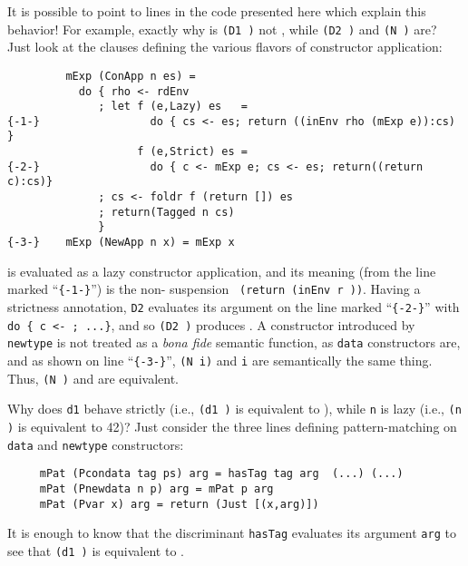 \documentclass{entcs} \usepackage{entcsmacro}
\begin{document}
{It is possible to point to lines in the code presented here which explain this
behavior! For example, exactly why is {\tt (D1 \undef)} not \undef, while {\tt (D2
\undef)} and {\tt (N \undef)} are? Just look at the clauses defining the various
flavors of constructor application:

\begin{minipage}[h]{6in}
{\footnotesize
\begin{verbatim}
         mExp (ConApp n es) =
           do { rho <- rdEnv
              ; let f (e,Lazy) es   =
{-1-}                 do { cs <- es; return ((inEnv rho (mExp e)):cs) }
                    f (e,Strict) es =
{-2-}                 do { c <- mExp e; cs <- es; return((return c):cs)}
              ; cs <- foldr f (return []) es
              ; return(Tagged n cs)
              }
{-3-}    mExp (NewApp n x) = mExp x

\end{verbatim}
}
\end{minipage}


 is evaluated as a lazy constructor application, and its
meaning (from the line marked ``{\small \verb+{-1-}+}'') is the non-\undef\/ suspension {\tt
(return (inEnv r \undef))}. Having a strictness annotation, {\tt D2} evaluates its
argument on the line marked ``{\small \verb+{-2-}+}'' with {\tt do \{ c <- \undef ; ...\}},
and so {\tt (D2 \undef)} produces \undef. A constructor introduced by {\tt newtype}
is not treated as a {\em bona fide} semantic function, as {\tt data} constructors
are, and as shown on line ``{\small \verb+{-3-}+}'', {\tt (N i)} and {\tt i} are semantically the same thing. Thus, {\tt (N
\undef)} and \undef\/ are equivalent.

Why does {\tt d1} behave strictly (i.e., {\tt (d1 \undef)} is equivalent to \undef),
while {\tt n} is lazy (i.e., {\tt (n \undef)} is equivalent to 42)? Just consider
the three lines defining pattern-matching on {\tt data} and {\tt newtype}
constructors:

{\footnotesize
\begin{verbatim}
     mPat (Pcondata tag ps) arg = hasTag tag arg  (...) (...)
     mPat (Pnewdata n p) arg = mPat p arg
     mPat (Pvar x) arg = return (Just [(x,arg)])
\end{verbatim}
}
\noindent It is enough to know that the discriminant {\tt hasTag} evaluates
its argument {\tt arg} to see that {\tt (d1 \undef)} is equivalent to \undef. 



}
\end{document}
